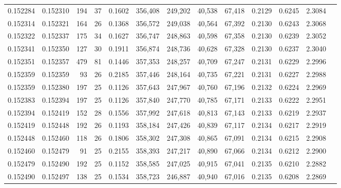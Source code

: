 \begin{tabular}{rrrrrrrrrrrrr}
0.152284 & 0.152310 &   194 &  37 &                                     0.1602 & 356,408 & 249,202 &  40,538 &  67,418 & 0.2129 & 0.6245 & 2.3084 \\
0.152314 & 0.152321 &   164 &  26 &                                     0.1368 & 356,572 & 249,038 &  40,564 &  67,392 & 0.2130 & 0.6243 & 2.3068 \\
0.152322 & 0.152337 &   175 &  34 &                                     0.1627 & 356,747 & 248,863 &  40,598 &  67,358 & 0.2130 & 0.6239 & 2.3052 \\
0.152341 & 0.152350 &   127 &  30 &                                     0.1911 & 356,874 & 248,736 &  40,628 &  67,328 & 0.2130 & 0.6237 & 2.3040 \\
0.152351 & 0.152357 &   479 &  81 &                                     0.1446 & 357,353 & 248,257 &  40,709 &  67,247 & 0.2131 & 0.6229 & 2.2996 \\
0.152359 & 0.152359 &    93 &  26 &                                     0.2185 & 357,446 & 248,164 &  40,735 &  67,221 & 0.2131 & 0.6227 & 2.2988 \\
0.152359 & 0.152380 &   197 &  25 &                                     0.1126 & 357,643 & 247,967 &  40,760 &  67,196 & 0.2132 & 0.6224 & 2.2969 \\
0.152383 & 0.152394 &   197 &  25 &                                     0.1126 & 357,840 & 247,770 &  40,785 &  67,171 & 0.2133 & 0.6222 & 2.2951 \\
0.152394 & 0.152419 &   152 &  28 &                                     0.1556 & 357,992 & 247,618 &  40,813 &  67,143 & 0.2133 & 0.6219 & 2.2937 \\
0.152419 & 0.152448 &   192 &  26 &                                     0.1193 & 358,184 & 247,426 &  40,839 &  67,117 & 0.2134 & 0.6217 & 2.2919 \\
0.152448 & 0.152460 &   118 &  26 &                                     0.1806 & 358,302 & 247,308 &  40,865 &  67,091 & 0.2134 & 0.6215 & 2.2908 \\
0.152460 & 0.152479 &    91 &  25 &                                     0.2155 & 358,393 & 247,217 &  40,890 &  67,066 & 0.2134 & 0.6212 & 2.2900 \\
0.152479 & 0.152490 &   192 &  25 &                                     0.1152 & 358,585 & 247,025 &  40,915 &  67,041 & 0.2135 & 0.6210 & 2.2882 \\
0.152490 & 0.152497 &   138 &  25 &                                     0.1534 & 358,723 & 246,887 &  40,940 &  67,016 & 0.2135 & 0.6208 & 2.2869 \\

\end{tabular}
